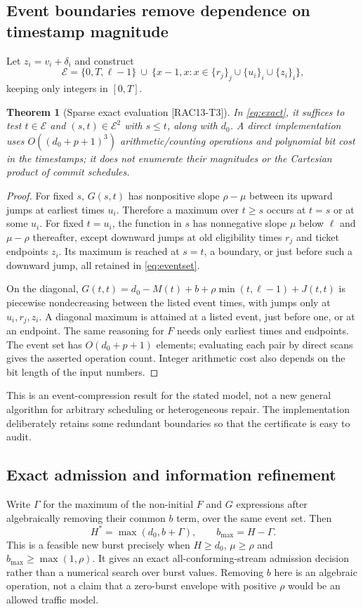 \documentclass[11pt,a4paper]{article}
\newtheorem{theorem}{Theorem}\newtheorem{proposition}[theorem]{Proposition}
\theoremstyle{definition}\newtheorem{definition}{Definition}
\newcommand{\idtag}[1]{\textnormal{\textsf{[#1]}}}
\begin{document}
\subsection{Event boundaries remove dependence on timestamp magnitude}
Let $z_i=v_i+\delta_i$ and construct
\begin{equation}
\mathcal E=\{0,T,\ell-1\}\ \cup\
\{x-1,x:x\in\{r_j\}_j\cup\{u_i\}_i\cup\{z_i\}_i\},
\label{eq:eventset}
\end{equation}
keeping only integers in $[0,T]$.
\begin{theorem}[Sparse exact evaluation \idtag{RAC13-T3}]
\label{thm:sparse}
In \cref{eq:exact}, it suffices to test $t\in\mathcal E$ and $(s,t)\in\mathcal E^2$ with $s\le t$, along with $d_0$. A direct implementation uses $O((d_0+p+1)^3)$ arithmetic/counting operations and polynomial bit cost in the timestamps; it does not enumerate their magnitudes or the Cartesian product of commit schedules.
\end{theorem}
\begin{proof}
For fixed $s$, $G(s,t)$ has nonpositive slope $\rho-\mu$ between its upward jumps at earliest times $u_i$. Therefore a maximum over $t\ge s$ occurs at $t=s$ or at some $u_i$. For fixed $t=u_i$, the function in $s$ has nonnegative slope $\mu$ below $\ell$ and $\mu-\rho$ thereafter, except downward jumps at old eligibility times $r_j$ and ticket endpoints $z_i$. Its maximum is reached at $s=t$, a boundary, or just before such a downward jump, all retained in \cref{eq:eventset}.

On the diagonal, $G(t,t)=d_0-M(t)+b+\rho\min(t,\ell-1)+J(t,t)$ is piecewise nondecreasing between the listed event times, with jumps only at $u_i,r_j,z_i$. A diagonal maximum is attained at a listed event, just before one, or at an endpoint. The same reasoning for $F$ needs only earliest times and endpoints. The event set has $O(d_0+p+1)$ elements; evaluating each pair by direct scans gives the asserted operation count. Integer arithmetic cost also depends on the bit length of the input numbers.
\end{proof}
This is an event-compression result for the stated model, not a new general algorithm for arbitrary scheduling or heterogeneous repair. The implementation deliberately retains some redundant boundaries so that the certificate is easy to audit.

\subsection{Exact admission and information refinement}
Write $\Gamma$ for the maximum of the non-initial $F$ and $G$ expressions after algebraically removing their common $b$ term, over the same event set. Then
\begin{equation}
H^*=\max(d_0,b+\Gamma),\qquad
\boxed{b_{\max}=H-\Gamma.}
\label{eq:inverse}
\end{equation}
This is a feasible new burst precisely when $H\ge d_0$, $\mu\ge\rho$ and $b_{\max}\ge\max(1,\rho)$. It gives an exact all-conforming-stream admission decision rather than a numerical search over burst values. Removing $b$ here is an algebraic operation, not a claim that a zero-burst envelope with positive $\rho$ would be an allowed traffic model.
\end{document}
